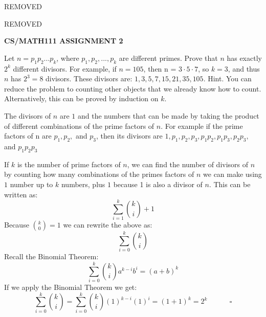 \documentclass{article}
\begin{document}
\centerline{REMOVED}
\centerline{REMOVED}
\centerline{\large \bf CS/MATH111 ASSIGNMENT 2}


\vskip 0.1in


\vskip 0.2in


\begin{problem}

Let $n = p_1 p_2 ... p_k$, where $p_1, p_2, ..., p_k$ are different primes. Prove that $n$ has exactly $2^k$ different divisors. 
For example, if $n = 105$, then n = $3 \cdot 5 \cdot 7$, so $k = 3$, and thus $n$ has $2^3 = 8$ divisors. These divisors are: $1, 3, 5, 7, 15, 21, 35, 105$.
Hint. You can reduce the problem to counting other objects that we already know how to count. Alternatively, this can be proved by induction on $k$.

\end{problem}


\begin{solution}

The divisors of $n$ are $1$ and the numbers that can be made by taking the product of different combinations of the prime factors of $n$.
For example if the prime factors of n are $p_1, p_2,$ and $p_3$, then its divisors are $1, p_1, p_2, p_3, p_1p_2, p_1p_3, p_2p_3,$ and  $p_1p_2p_3$

\smallskip

If $k$ is the number of prime factors of $n$, we can find the number of divisors of $n$ by counting how many combinations of the primes factors of $n$ we can make using $1$ number up to $k$ numbers, plus $1$ because 1 is also a divisor of $n$. This can be written as:
$$\sum_{i=1}^k {k \choose i}+1$$
Because ${k \choose 0} = 1$ we can rewrite the above as:
$$\sum_{i=0}^k {k \choose i}$$
Recall the Binomial Theorem:
$$\sum_{i=0}^k {k \choose i}a^{k-i}b^{i} = (a+b)^{k}$$
If we apply the Binomial Theorem we get:
$$\sum_{i=0}^k {k \choose i}=\sum_{i=0}^k {k \choose i}(1)^{k-i}(1)^{i}=(1+1)^{k} = 2^{k}\>\>\>\>\>\>\>\>\>\>\>\>\>\>\square$$


\end{solution}

\end{document}
